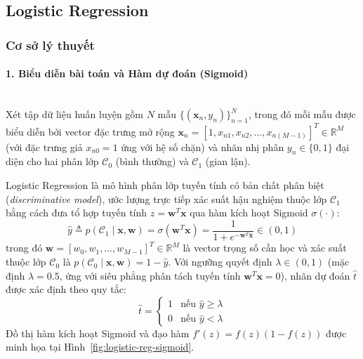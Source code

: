 \subsection{Logistic Regression}

\subsubsection{Cơ sở lý thuyết}

\paragraph{1. Biểu diễn bài toán và Hàm dự đoán (Sigmoid)}\mbox{}\\
Xét tập dữ liệu huấn luyện gồm $N$ mẫu $\{(\mathbf{x}_n, y_n)\}_{n=1}^{N}$, trong đó mỗi mẫu được biểu diễn bởi vector đặc trưng mở rộng $\mathbf{x}_n = [1, x_{n1}, x_{n2}, \dots, x_{n(M-1)}]^T \in \mathbb{R}^M$ (với đặc trưng giả $x_{n0} = 1$ ứng với hệ số chặn) và nhãn nhị phân $y_n \in \{0, 1\}$ đại diện cho hai phân lớp $\mathcal{C}_0$ (bình thường) và $\mathcal{C}_1$ (gian lận).

Logistic Regression là mô hình phân lớp tuyến tính có bản chất phân biệt (\textit{discriminative model}), ước lượng trực tiếp xác suất hậu nghiệm thuộc lớp $\mathcal{C}_1$ bằng cách đưa tổ hợp tuyến tính $z = \mathbf{w}^T\mathbf{x}$ qua hàm kích hoạt Sigmoid $\sigma(\cdot)$:
\begin{equation}
    \hat{y} \triangleq p(\mathcal{C}_1 \mid \mathbf{x}, \mathbf{w}) = \sigma(\mathbf{w}^T \mathbf{x}) = \frac{1}{1 + e^{-\mathbf{w}^T \mathbf{x}}} \in (0, 1)
\end{equation}
trong đó $\mathbf{w} = [w_0, w_1, \dots, w_{M-1}]^T \in \mathbb{R}^M$ là vector trọng số cần học và xác suất thuộc lớp $\mathcal{C}_0$ là $p(\mathcal{C}_0 \mid \mathbf{x}, \mathbf{w}) = 1 - \hat{y}$. Với ngưỡng quyết định $\lambda \in (0, 1)$ (mặc định $\lambda = 0.5$, ứng với siêu phẳng phân tách tuyến tính $\mathbf{w}^T\mathbf{x} = 0$), nhãn dự đoán $\hat{t}$ được xác định theo quy tắc:
\begin{equation}
    \hat{t} = \begin{cases} 
        1 & \text{nếu } \hat{y} \ge \lambda \\
        0 & \text{nếu } \hat{y} < \lambda 
    \end{cases}
\end{equation}
Đồ thị hàm kích hoạt Sigmoid và đạo hàm $f'(z) = f(z)(1 - f(z))$ được minh họa tại Hình~\ref{fig:logistic-reg-sigmoid}.

